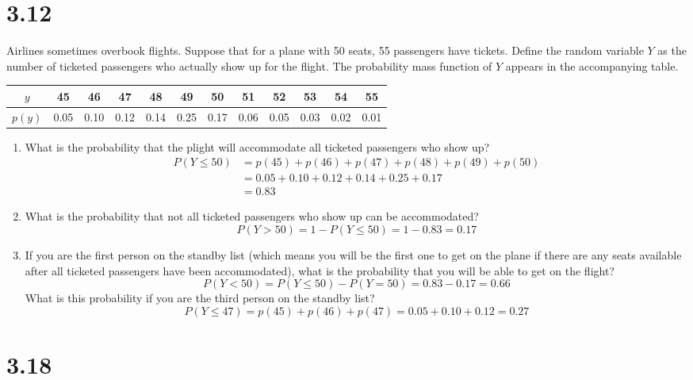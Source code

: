 \documentclass[letterpaper,12pt,fleqn]{article}
\begin{document}
\section*{3.12}

Airlines sometimes overbook flights.  Suppose that for a plane with 50 seats, 55 passengers have tickets.  Define the random
variable \(Y\) as the number of ticketed passengers who actually show up for the flight.  The probability mass function of
\(Y\) appears in the accompanying table.

\begin{tabular}{c|ccccccccccc}
  \(y\) & 45 & 46 & 47 & 48 & 49 & 50 & 51 & 52 & 53 & 54 & 55 \\
  \hline
  \(p(y)\) & 0.05 & 0.10 & 0.12 & 0.14 & 0.25 & 0.17 & 0.06 & 0.05 & 0.03 & 0.02 & 0.01
\end{tabular}

\begin{enumerate}[label={\alph*)}]
\item What is the probability that the plight will accommodate all ticketed passengers who show up?
  \begin{align*}
    P(Y\le50) &= p(45)+p(46)+p(47)+p(48)+p(49)+p(50) \\
    &= 0.05+0.10+0.12+0.14+0.25+0.17 \\
    &= 0.83
  \end{align*}

\item What is the probability that not all ticketed passengers who show up can be accommodated?
  \[P(Y>50)=1-P(Y\le50)=1-0.83=0.17\]

\item If you are the first person on the standby list (which means you will be the first one to get on the plane if there
  are any seats available after all ticketed passengers have been accommodated), what is the probability that you will be
  able to get on the flight?
  \[P(Y<50)=P(Y\le50)-P(Y=50)=0.83-0.17=0.66\]
  What is this probability if you are the third person on the standby list?
  \[P(Y\le47)=p(45)+p(46)+p(47)=0.05+0.10+0.12=0.27\]
\end{enumerate}

\section*{3.18}
\end{document}
